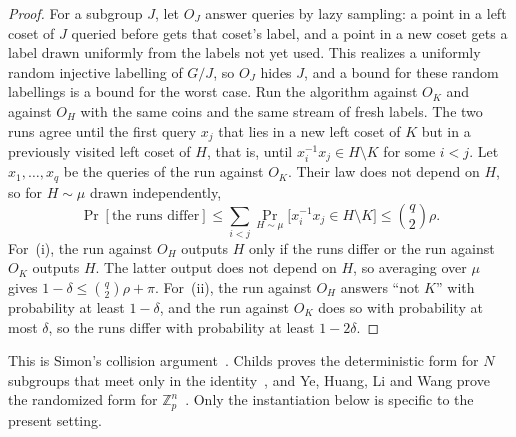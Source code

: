 \begin{proof}
For a subgroup $J$, let $O_J$ answer queries by lazy sampling: a point in a left coset of $J$ queried before gets that coset's label, and a point in a new coset gets a label drawn uniformly from the labels not yet used. This realizes a uniformly random injective labelling of $G/J$, so $O_J$ hides $J$, and a bound for these random labellings is a bound for the worst case. Run the algorithm against $O_K$ and against $O_H$ with the same coins and the same stream of fresh labels. The two runs agree until the first query $x_j$ that lies in a new left coset of $K$ but in a previously visited left coset of $H$, that is, until $x_i^{-1}x_j \in H\setminus K$ for some $i<j$. Let $x_1,\dots,x_q$ be the queries of the run against $O_K$. Their law does not depend on $H$, so for $H\sim\mu$ drawn independently,
\[
  \Pr[\text{the runs differ}] \le \sum_{i<j}\Pr_{H\sim\mu}\bigl[x_i^{-1}x_j \in H\setminus K\bigr] \le \binom{q}{2}\rho .
\]
For~(i), the run against $O_H$ outputs $H$ only if the runs differ or the run against $O_K$ outputs $H$. The latter output does not depend on $H$, so averaging over $\mu$ gives $1-\delta \le \binom q2\rho + \pi$. For~(ii), the run against $O_H$ answers ``not $K$'' with probability at least $1-\delta$, and the run against $O_K$ does so with probability at most $\delta$, so the runs differ with probability at least $1-2\delta$.
\end{proof}

This is Simon's collision argument~\cite{Simon1997}. Childs proves the deterministic form for $N$ subgroups that meet only in the identity~\cite[Theorem~5.1]{ChildsQA}, and Ye, Huang, Li and Wang prove the randomized form for $\mathbb{Z}_p^n$~\cite[Lemma~1]{YeHuangLiWang2021}. Only the instantiation below is specific to the present setting.

